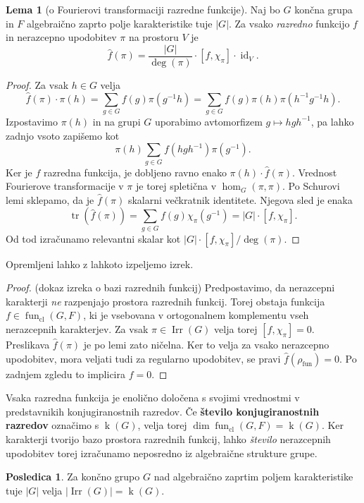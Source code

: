 \documentclass[11pt]{book}
\DeclareMathOperator\tr{tr}
\DeclareMathOperator\Irr{Irr}
\DeclareMathOperator\kk{k}
\DeclareMathOperator\cl{cl}
\DeclareMathOperator\fun{fun}
\DeclareMathOperator\id{id}
\def\definicija{\color{rdeca}\bf}
\theoremstyle{definition}
\theoremstyle{zgled}
\theoremstyle{zgledbrezstevilke}
\theoremstyle{odprtproblem}
\theoremstyle{domacanaloga}
\newenvironment{dokaz}
    {\color{siva}\begin{proof}}
    {\end{proof}}
\theoremstyle{izrek}
\newtheorem{lema}[theorem]{Lema}
\newtheorem{posledica}[theorem]{Posledica}
\begin{document}
\begin{lema}[o Fourierovi transformaciji razredne funkcije]
Naj bo $G$ končna grupa in $F$ algebraično zaprto polje karakteristike tuje $|G|$. Za vsako \emph{razredno} funkcijo $f$ in nerazcepno upodobitev $\pi$ na prostoru $V$ je 
\[
    \hat{f}(\pi) = 
    \frac{|G|}{\deg(\pi)} \cdot [ f, \chi_{\pi} ] \cdot {\textstyle \id_V}.
\]
\end{lema}
\begin{dokaz}
Za vsak $h \in G$ velja
\[
    \hat{f}(\pi) \cdot \pi(h) =  \sum_{g \in G} f(g) \pi(g^{-1}h)
    =  \sum_{g \in G} f(g) \pi(h) \pi(h^{-1}g^{-1}h).
\]
Izpostavimo $\pi(h)$ in na grupi $G$ uporabimo avtomorfizem $g \mapsto h g h^{-1}$, pa lahko zadnjo vsoto zapišemo kot
\[
    \pi(h)  \sum_{g \in G} f(hgh^{-1}) \pi(g^{-1}).
\]
Ker je $f$ razredna funkcija, je dobljeno ravno enako $\pi(h) \cdot \hat{f}(\pi)$. Vrednost Fourierove transformacije v $\pi$ je torej spletična v $\hom_G(\pi, \pi)$. Po Schurovi lemi sklepamo, da je $\hat{f}(\pi)$ skalarni večkratnik identitete. Njegova sled je enaka
\[
    \tr \left( \hat{f}(\pi) \right) =  \sum_{g \in G} f(g) \chi_{\pi}(g^{-1}) = |G| \cdot [ f, \chi_{\pi} ].
\]
Od tod izračunamo relevantni skalar kot $|G| \cdot [ f, \chi_{\pi} ]/\deg(\pi)$.
\end{dokaz}

Opremljeni lahko z lahkoto izpeljemo izrek.

\begin{dokaz}(dokaz izreka o bazi razrednih funkcij) Predpostavimo, da nerazcepni karakterji \emph{ne} razpenjajo prostora razrednih funkcij. Torej obstaja funkcija $f \in \fun_{\cl}(G,F)$, ki je vsebovana v ortogonalnem komplementu vseh nerazcepnih karakterjev. Za vsak $\pi \in \Irr(G)$ velja torej $[ f, \chi_{\pi} ] = 0$. Preslikava $\hat{f}(\pi)$ je po lemi zato ničelna. Ker to velja za vsako nerazcepno upodobitev, mora veljati tudi za regularno upodobitev, se pravi $\hat{f}(\rho_{\fun}) = 0$. Po zadnjem zgledu to implicira $f = 0$. 
\end{dokaz}

Vsaka razredna funkcija je enolično določena s svojimi vrednostmi v predstavnikih konjugiranostnih razredov. Če {\definicija število konjugiranostnih razredov} označimo s $\kk(G)$, velja torej $\dim \fun_{\cl}(G,F) = \kk(G)$. Ker karakterji tvorijo bazo prostora razrednih funkcij, lahko \emph{število} nerazcepnih upodobitev torej izračunamo neposredno iz algebraične strukture grupe.

\begin{posledica}
Za končno grupo $G$ nad algebraično zaprtim poljem karakteristike tuje $|G|$ velja $|\Irr(G)| = \kk(G)$.
\end{posledica}
\end{document}
